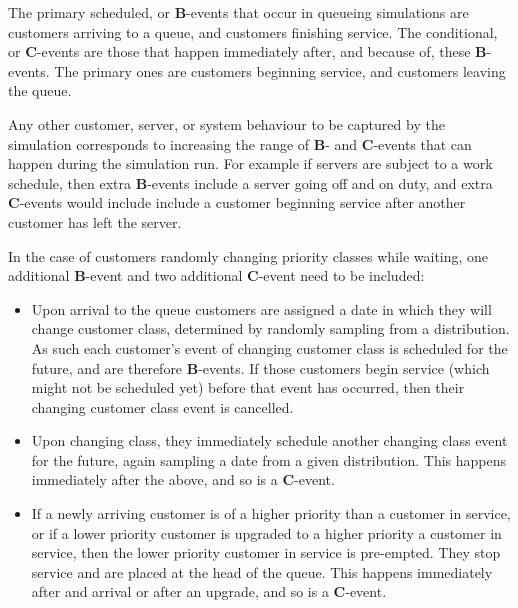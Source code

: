 \documentclass{article}
\begin{document}
The primary scheduled, or \textbf{B}-events that occur in queueing simulations
are customers arriving to a queue, and customers finishing service.
The conditional, or \textbf{C}-events are those that happen immediately after,
and because of, these \textbf{B}-events. The primary ones are customers
beginning service, and customers leaving the queue.

Any other customer, server, or system behaviour to be captured by the simulation
corresponds to increasing the range of \textbf{B}- and \textbf{C}-events that
can happen during the simulation run. For example if servers are subject to a
work schedule, then extra \textbf{B}-events include a server going off and on
duty, and extra \textbf{C}-events would include include a customer beginning
service after another customer has left the server.

In the case of customers randomly changing priority classes while waiting, one
additional \textbf{B}-event and two additional \textbf{C}-event need to be
included:

\begin{itemize}
  \item Upon arrival to the queue customers are assigned a date in which they
  will change customer class, determined by randomly sampling from a
  distribution. As such each customer's event of changing customer class is
  scheduled for the future, and are therefore \textbf{B}-events. If those
  customers begin service (which might not be scheduled yet) before that event
  has occurred, then their changing customer class event is cancelled.
  \item Upon changing class, they immediately schedule another changing class
  event for the future, again sampling a date from a given distribution. This
  happens immediately after the above, and so is a \textbf{C}-event.
  \item If a newly arriving customer is of a higher priority than a customer in
  service, or if a lower priority customer is upgraded to a higher priority a
  customer in service, then the lower priority customer in service is
  pre-empted. They stop service and are placed at the head of the queue. This
  happens immediately after and arrival or after an upgrade, and so is a
  \textbf{C}-event.
\end{itemize}
\end{document}
